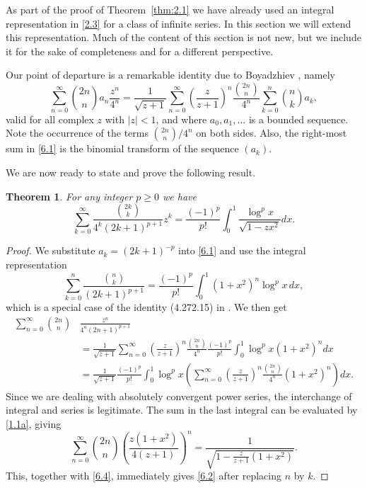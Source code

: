 \documentclass{amsart}
\newtheorem{theorem}{Theorem}[section]
\theoremstyle{definition}
\theoremstyle{remark}
\numberwithin{equation}{section}
\begin{document}
As part of the proof of Theorem~\ref{thm:2.1} we have already used an integral
representation in \eqref{2.3} for a class of infinite series. In this section
we will extend this representation. Much of the content of this section is not
new, but we include it for the sake of completeness and for a different 
perspective.

Our point of departure is a remarkable identity due to Boyadzhiev
\cite[eq.~(3.36)]{Bo}, namely
\begin{equation}\label{6.1}
\sum_{n=0}^\infty\binom{2n}{n}a_n\frac{z^n}{4^n}
=\frac{1}{\sqrt{z+1}}\sum_{n=0}^\infty\left(\frac{z}{z+1}\right)^n
\frac{\binom{2n}{n}}{4^n}\sum_{k=0}^n\binom{n}{k}a_k,
\end{equation}
valid for all complex $z$ with $|z|<1$, and where $a_0, a_1,\ldots$ is a 
bounded sequence. Note the occurrence of the terms $\binom{2n}{n}/4^n$ on both
sides. Also, the right-most sum in \eqref{6.1} is the binomial transform of the
sequence $(a_k)$.

We are now ready to state and prove the following result.

\begin{theorem}\label{thm:6.1}
For any integer $p\geq 0$ we have
\begin{equation}\label{6.2}
\sum_{k=0}^\infty\frac{\binom{2k}{k}}{4^k(2k+1)^{p+1}}z^k
=\frac{(-1)^p}{p!}\int_0^1\frac{\log^p{x}}{\sqrt{1-zx^2}}dx.
\end{equation}
\end{theorem}

\begin{proof}
We substitute $a_k=(2k+1)^{-p}$ into \eqref{6.1} and use the integral 
representation 
\begin{equation}\label{6.3}
\sum_{k=0}^n\frac{\binom{n}{k}}{(2k+1)^{p+1}}
=\frac{(-1)^p}{p!}\int_0^1(1+x^2)^n\log^p{x}\,dx,
\end{equation}
which is a special case of the identity (4.272.15) in \cite[p.~552]{GR}.
We then get
\begin{align}
\sum_{n=0}^\infty\binom{2n}{n}&\frac{z^n}{4^n(2n+1)^{p+1}} \label{6.4}\\
&=\frac{1}{\sqrt{z+1}}\sum_{n=0}^\infty\left(\frac{z}{z+1}\right)^n
\frac{\binom{2n}{n}}{4^n}\frac{(-1)^p}{p!}\int_0^1\log^p{x}(1+x^2)^ndx\nonumber\\
&=\frac{1}{\sqrt{z+1}}\frac{(-1)^p}{p!}\int_0^1\log^p{x}
\left(\sum_{n=0}^\infty\left(\frac{z}{z+1}\right)^n\frac{\binom{2n}{n}}{4^n}
(1+x^2)^n\right)dx.\nonumber
\end{align}
Since we are dealing with absolutely convergent power series, the interchange
of integral and series is legitimate. The sum in the last integral can be 
evaluated by \eqref{1.1a}, giving
\[
\sum_{n=0}^\infty\binom{2n}{n}\left(\frac{z(1+x^2)}{4(z+1)}\right)^n
=\frac{1}{\sqrt{1-\frac{z}{z+1}(1+x^2)}}.
\]
This, together with \eqref{6.4}, immediately gives \eqref{6.2} after replacing
$n$ by $k$.
\end{proof}
\end{document}
